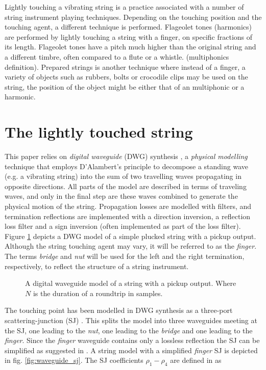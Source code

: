 \documentclass{sigchi}
\begin{document}
Lightly touching a vibrating string is a practice associated with a number of string instrument playing techniques. Depending on the touching position and the touching agent, a different technique is performed. Flageolet tones (harmonics) are performed by lightly touching a string with a finger, on specific fractions of its length. Flageolet tones have a pitch much higher than the original string and a different timbre, often compared to a flute or a whistle. (multiphonics definition). Prepared strings is another technique where instead of a finger, a variety of objects such as rubbers, bolts or crocodile clips may be used on the string, the position of the object might be either that of an multiphonic or a harmonic.

\section{The lightly touched string}

This paper relies on \textit{digital waveguide} (DWG) synthesis \cite{smith_physical_1992}, a \textit{physical modelling} technique that employs D'Alambert's principle to decompose a standing wave (e.g. a vibrating string) into the sum of two travelling waves propagating in opposite directions. All parts of the model are described in terms of traveling waves, and only in the final step are these waves combined to generate the physical motion of the string. Propagation losses are modelled with filters, and termination reflections are implemented with a direction inversion, a reflection loss filter and a sign inversion (often implemented as part of the loss filter). Figure \ref{fig:pickup} depicts a DWG model of a simple plucked string with a pickup output. Although the string touching agent may vary, it will be referred to as the \textit{finger}. The terms \textit{bridge} and \textit{nut} will be used for the left and the right termination, respectively, to reflect the structure of a string instrument.

\begin{figure}[h]
	\centering
	\scalebox{0.75}{}
	\caption{A digital waveguide model of a string with a pickup output. Where $N$ is the duration of a roundtrip in samples.}
	\label{fig:pickup}
\end{figure}

The touching point has been modelled in DWG synthesis as a three-port scattering-junction (SJ) \cite{scavone_digital_1997, valimaki_modeling_1993}. This splits the model into three waveguides meeting at the SJ, one leading to the \textit{nut}, one leading to the \textit{bridge} and one leading to the \textit{finger}. Since the \textit{finger} waveguide contains only a lossless reflection the SJ can be simplified as suggested in \cite{pakarinen_physical_2005}. A string model with a simplified \textit{finger} SJ is depicted in fig. \ref{fig:waveguide_sj}. The SJ coefficients $\rho_1 - \rho_4$ are defined in \cite{pakarinen_physical_2005} as
\end{document}
